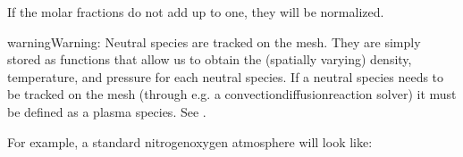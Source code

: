 \documentclass[letterpaper,10pt,english]{sphinxmanual}
\begin{document}
If the molar fractions do not add up to one, they will be normalized.

\begin{sphinxadmonition}{warning}{Warning:}
Neutral species are  tracked on the mesh.
They are simply stored as functions that allow us to obtain the (spatially varying) density, temperature, and pressure for each neutral species.
If a neutral species needs to be tracked on the mesh (through e.g. a convection\sphinxhyphen{}diffusion\sphinxhyphen{}reaction solver) it must be defined as a plasma species.
See {\hyperref[\detokenize{Applications/CdrPlasmaModel:chap-plasmaspeciesjson}]{}}.
\end{sphinxadmonition}

For example, a standard nitrogen\sphinxhyphen{}oxygen atmosphere will look like:

\begin{sphinxVerbatim}[commandchars=\\\{\},formatcom=\scriptsize]
       
       
       
       
      \PYG{p}{[}
           
           
           
           
    \PYG{p}{]}
\end{sphinxVerbatim}
\end{document}
